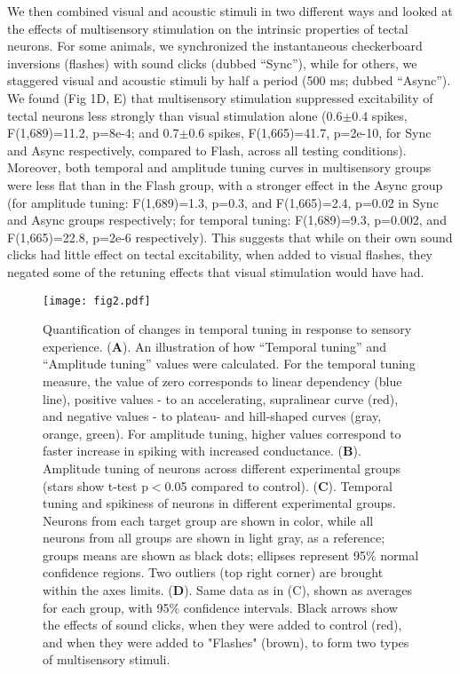 \documentclass{article}
\begin{document}
We then combined visual and acoustic stimuli in two different ways and looked at the effects of multisensory stimulation on the intrinsic properties of tectal neurons. For some animals, we synchronized the instantaneous checkerboard inversions (flashes) with sound clicks (dubbed “Sync”), while for others, we staggered visual and acoustic stimuli by half a period (500 ms; dubbed “Async”). We found (Fig 1D, E) that multisensory stimulation suppressed excitability of tectal neurons less strongly than visual stimulation alone (0.6$\pm$0.4 spikes, F(1,689)=11.2, p=8e-4; and 0.7$\pm$0.6 spikes, F(1,665)=41.7, p=2e-10, for Sync and Async respectively, compared to Flash, across all testing conditions). Moreover, both temporal and amplitude tuning curves in multisensory groups were less flat than in the Flash group, with a stronger effect in the Async group (for amplitude tuning: F(1,689)=1.3, p=0.3, and F(1,665)=2.4, p=0.02 in Sync and Async groups respectively; for temporal tuning: F(1,689)=9.3, p=0.002, and F(1,665)=22.8, p=2e-6 respectively). This suggests that while on their own sound clicks had little effect on tectal excitability, when added to visual flashes, they negated some of the retuning effects that visual stimulation would have had.

\begin{figure*}[!t]
\texttt{[image: fig2.pdf]}
\caption{
Quantification of changes in temporal tuning in response to sensory experience. (\textbf{A}). An illustration of how “Temporal tuning” and “Amplitude tuning” values were calculated. For the temporal tuning measure, the value of zero corresponds to linear dependency (blue line), positive values - to an accelerating, supralinear curve (red), and negative values - to plateau- and hill-shaped curves (gray, orange, green). For amplitude tuning, higher values correspond to faster increase in spiking with increased conductance. (\textbf{B}). Amplitude tuning of neurons across different experimental groups (stars show t-test p$<$0.05 compared to control). (\textbf{C}). Temporal tuning and spikiness of neurons in different experimental groups. Neurons from each target group are shown in color, while all neurons from all groups are shown in light gray, as a reference; groups means are shown as black dots; ellipses represent 95\% normal confidence regions. Two outliers (top right corner) are brought within the axes limits. (\textbf{D}). Same data as in (C), shown as averages for each group, with 95\% confidence intervals. Black arrows show the effects of sound clicks, when they were added to control (red), and when they were added to "Flashes" (brown), to form two types of multisensory stimuli.}
\end{figure*}
\end{document}
